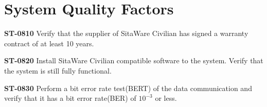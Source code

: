 \section{System Quality Factors}

\textbf{ST-0810} Verify that the supplier of SitaWare Civilian has signed a warranty contract of at least 10 years.

\textbf{ST-0820} Install SitaWare Civilian compatible software to the system. Verify that the system is still fully functional. 

\textbf{ST-0830} Perform a bit error rate test(BERT) of the data communication and verify that it has a bit error rate(BER) of $10^{-3}$ or less. 